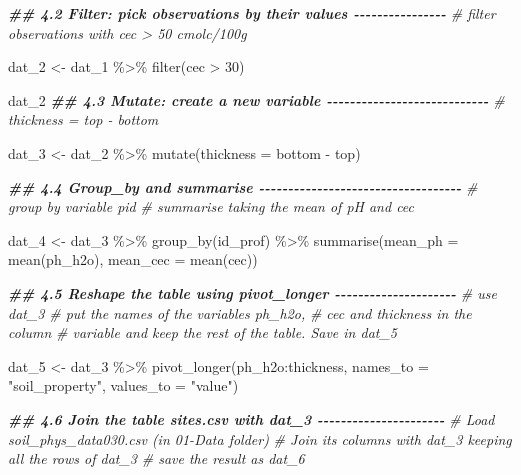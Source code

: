 \documentclass[
  10pt,
  b5paper,
  oneside]{book}
\newenvironment{Shaded}{\begin{snugshade}}{\end{snugshade}}
\newcommand{\AttributeTok}[1]{\textcolor[rgb]{0.77,0.63,0.00}{#1}}
\newcommand{\CommentTok}[1]{\textcolor[rgb]{0.56,0.35,0.01}{\textit{#1}}}
\newcommand{\DecValTok}[1]{\textcolor[rgb]{0.00,0.00,0.81}{#1}}
\newcommand{\DocumentationTok}[1]{\textcolor[rgb]{0.56,0.35,0.01}{\textbf{\textit{#1}}}}
\newcommand{\FunctionTok}[1]{\textcolor[rgb]{0.00,0.00,0.00}{#1}}
\newcommand{\NormalTok}[1]{#1}
\newcommand{\OtherTok}[1]{\textcolor[rgb]{0.56,0.35,0.01}{#1}}
\newcommand{\SpecialCharTok}[1]{\textcolor[rgb]{0.00,0.00,0.00}{#1}}
\newcommand{\StringTok}[1]{\textcolor[rgb]{0.31,0.60,0.02}{#1}}
\begin{document}
\begin{Shaded}
\begin{Highlighting}[]
\DocumentationTok{\#\# 4.2 Filter: pick observations by their values {-}{-}{-}{-}{-}{-}{-}{-}{-}{-}{-}{-}{-}{-}{-}{-}}
\CommentTok{\# filter observations with cec \textgreater{} 50 cmolc/100g}

\NormalTok{dat\_2 }\OtherTok{\textless{}{-}}\NormalTok{ dat\_1 }\SpecialCharTok{\%\textgreater{}\%} 
  \FunctionTok{filter}\NormalTok{(cec }\SpecialCharTok{\textgreater{}} \DecValTok{30}\NormalTok{)}

\NormalTok{dat\_2}
\DocumentationTok{\#\# 4.3 Mutate: create a new variable {-}{-}{-}{-}{-}{-}{-}{-}{-}{-}{-}{-}{-}{-}{-}{-}{-}{-}{-}{-}{-}{-}{-}{-}{-}{-}{-}{-}}
\CommentTok{\# thickness = top {-} bottom}

\NormalTok{dat\_3 }\OtherTok{\textless{}{-}}\NormalTok{ dat\_2 }\SpecialCharTok{\%\textgreater{}\%} 
  \FunctionTok{mutate}\NormalTok{(}\AttributeTok{thickness =}\NormalTok{ bottom }\SpecialCharTok{{-}}\NormalTok{ top)}

\DocumentationTok{\#\# 4.4 Group\_by and summarise {-}{-}{-}{-}{-}{-}{-}{-}{-}{-}{-}{-}{-}{-}{-}{-}{-}{-}{-}{-}{-}{-}{-}{-}{-}{-}{-}{-}{-}{-}{-}{-}{-}{-}{-}}
\CommentTok{\# group by variable pid}
\CommentTok{\# summarise taking the mean of pH and cec}

\NormalTok{dat\_4 }\OtherTok{\textless{}{-}}\NormalTok{ dat\_3 }\SpecialCharTok{\%\textgreater{}\%} 
  \FunctionTok{group\_by}\NormalTok{(id\_prof) }\SpecialCharTok{\%\textgreater{}\%} 
  \FunctionTok{summarise}\NormalTok{(}\AttributeTok{mean\_ph =} \FunctionTok{mean}\NormalTok{(ph\_h2o),}
            \AttributeTok{mean\_cec =} \FunctionTok{mean}\NormalTok{(cec))}

\DocumentationTok{\#\# 4.5 Reshape the table using pivot\_longer {-}{-}{-}{-}{-}{-}{-}{-}{-}{-}{-}{-}{-}{-}{-}{-}{-}{-}{-}{-}{-}}
\CommentTok{\# use dat\_3}
\CommentTok{\# put the names of the variables ph\_h2o, }
\CommentTok{\# cec and thickness in the column }
\CommentTok{\# variable and keep the rest of the table. Save in dat\_5 }

\NormalTok{dat\_5 }\OtherTok{\textless{}{-}}\NormalTok{ dat\_3 }\SpecialCharTok{\%\textgreater{}\%} 
  \FunctionTok{pivot\_longer}\NormalTok{(ph\_h2o}\SpecialCharTok{:}\NormalTok{thickness, }\AttributeTok{names\_to =} \StringTok{"soil\_property"}\NormalTok{,}
               \AttributeTok{values\_to =} \StringTok{"value"}\NormalTok{)}

\DocumentationTok{\#\# 4.6 Join the table sites.csv with dat\_3 {-}{-}{-}{-}{-}{-}{-}{-}{-}{-}{-}{-}{-}{-}{-}{-}{-}{-}{-}{-}{-}{-}}
\CommentTok{\# Load soil\_phys\_data030.csv (in 01{-}Data folder) }
\CommentTok{\# Join its columns with dat\_3 keeping all the rows of dat\_3}
\CommentTok{\# save the result as dat\_6}


\end{Highlighting}
\end{Shaded}
\end{document}
